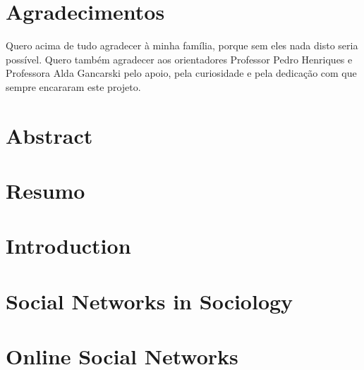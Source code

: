 \documentclass[
  oneside,
  11pt, a4paper,
  footinclude=true,
  headinclude=true,
  cleardoublepage=empty
]{scrbook}
\author{Jorge Caldas}
\date{\myear}
\begin{document}
	\umfrontcover
	\umtitlepage

	\chapter*{Agradecimentos}
	Quero acima de tudo agradecer à minha família, porque sem eles nada disto seria possível. Quero também agradecer aos orientadores Professor Pedro Henriques e Professora Alda Gancarski pelo apoio, pela curiosidade e pela dedicação com que sempre encararam este projeto.

	\chapter*{Abstract}
	

	\cleardoublepage
	\chapter*{Resumo}
	

	\tableofcontents


	\listoffigures
	\listoftables
	\printglossary[type=\acronymtype]
	\clearpage
	\thispagestyle{empty}


	\chapter{Introduction}
	


	\chapter{Social Networks in Sociology}
	


	\chapter{Online Social Networks}
	
\end{document}
